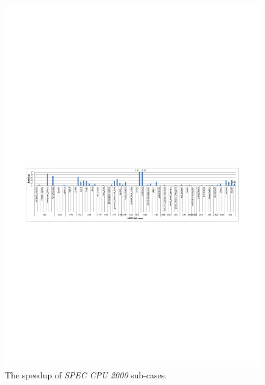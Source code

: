 \documentclass[bst/sn-mathphys]{sn-jnl}%
\theoremstyle{thmstyleone}%
\theoremstyle{thmstyletwo}%
\theoremstyle{thmstylethree}%
\begin{document}
\begin{figure}[h]%
\centering
\includegraphics[width=1\textwidth]{fig/spec2000.pdf}
\caption{The speedup of \emph{SPEC CPU 2000} sub-cases. }\label{FIG12}
\end{figure}
\end{document}
